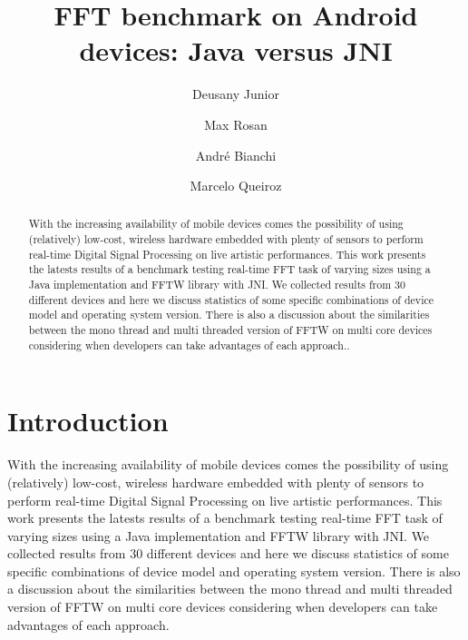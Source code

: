 \documentclass[12pt]{article}
\title{FFT benchmark on Android devices: Java versus JNI}
\author{Deusany Junior\inst{1} \and Max Rosan\inst{1} \and André
Bianchi\inst{1} \and Marcelo Queiroz\inst{1}}
\begin{document}
\maketitle

\begin{abstract}

With  the increasing availability of mobile devices comes the possibility of  using (relatively) low-cost, wireless hardware embedded with plenty of  sensors to perform real-time Digital Signal Processing on live artistic  performances. This work presents the latests results of a benchmark  testing real-time FFT task of varying sizes using a Java implementation  and FFTW library with JNI. We collected results from 30 different  devices and here we discuss statistics of some specific combinations of  device model and operating system version. There is also a discussion  about the similarities between the mono thread and multi threaded  version of FFTW on multi core devices considering when developers can  take advantages of each approach..

\end{abstract}


\section{Introduction}

With  the increasing availability of mobile devices comes the possibility of  using (relatively) low-cost, wireless hardware embedded with plenty of  sensors to perform real-time Digital Signal Processing on live artistic  performances. This work presents the latests results of a benchmark  testing real-time FFT task of varying sizes using a Java implementation  and FFTW library with JNI. We collected results from 30 different  devices and here we discuss statistics of some specific combinations of  device model and operating system version. There is also a discussion  about the similarities between the mono thread and multi threaded  version of FFTW on multi core devices considering when developers can  take advantages of each approach.


\end{document}
